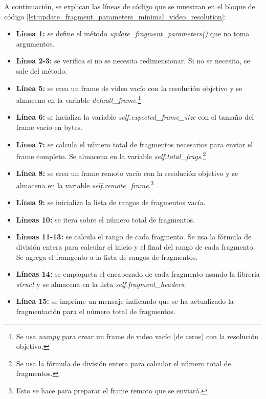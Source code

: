 A continuación, se explican las líneas de código que se muestran en el bloque de código \ref{lst:update_fragment_parameters_minimal_video_resolution}:
\begin{itemize}
    \item \textbf{Línea 1:} se define el método \textit{update\_fragment\_parameters()} que no toma argumentos.
    \item \textbf{Línea 2-3:} se verifica si no se necesita redimensionar. Si no se necesita, se sale del método.
    \item \textbf{Línea 5:} se crea un frame de video vacío con la resolución objetivo y se almacena en la variable \textit{default\_frame}.\footnote{Se usa \textit{numpy} para crear un frame de video vacío (de ceros) con la resolución objetivo.}
    \item \textbf{Línea 6:} se incializa la variable \textit{self.expected\_frame\_size} con el tamaño del frame vacío en bytes.
    \item \textbf{Línea 7:} se calcula el número total de fragmentos necesarios para enviar el frame completo. Se almacena en la variable \textit{self.total\_frags}.\footnote{Se usa la fórmula de división entera para calcular el número total de fragmentos.}
    \item \textbf{Línea 8:} se crea un frame remoto vacío con la resolución objetivo y se almacena en la variable \textit{self.remote\_frame}.\footnote{Esto se hace para preparar el frame remoto que se enviará.}
    \item \textbf{Línea 9:} se inicializa la lista de rangos de fragmentos vacía.
    \item \textbf{Líneas 10:} se itera sobre el número total de fragmentos.
    \item \textbf{Líneas 11-13:} se calcula el rango de cada fragmento. Se usa la fórmula de división entera para calcular el inicio y el final del rango de cada fragmento. Se agrega el framgento a la lista de rangos de fragmentos.
    \item \textbf{Líneas 14:} se empaqueta el encabezado de cada fragmento usando la libreria \textit{struct} y se almacena en la lista \textit{self.fragment\_headers}.
    \item \textbf{Línea 15:} se imprime un mensaje indicando que se ha actualizado la fragmentación para el número total de fragmentos.
\end{itemize}
\vspace{\baselineskip}

